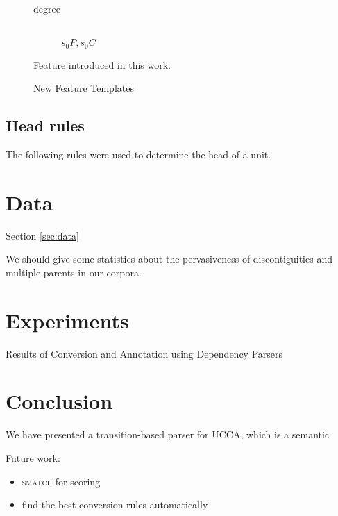 \documentclass[11pt]{article}
\newcommand{\secref}[1]{Section \ref{#1}}
\begin{document}
\begin{figure}[t]
\begin{description}
	\item[degree] \hfill \\
	$s_0P, s_0C$
\end{description}
\caption{New Feature Templates}
\medskip
\small
Feature introduced in this work.
\label{fig:new_features}
\end{figure}

\subsection{Head rules}
\label{subsec:head_rules}

The following rules were used to determine the head of a unit.

\section{Data}\secref{sec:data}

We should give some statistics about the pervasiveness of discontiguities and multiple parents in our corpora.

\section{Experiments}

\begin{table*}
\caption{Results of Conversion and Annotation using Dependency Parsers}
\label{table:convert}
\end{table*}


\section{Conclusion}

We have presented a transition-based parser for UCCA, which is a semantic 

Future work:
\begin{itemize}
\item \textsc{smatch} for scoring
\item find the best conversion rules automatically
\end{itemize}
\end{document}
